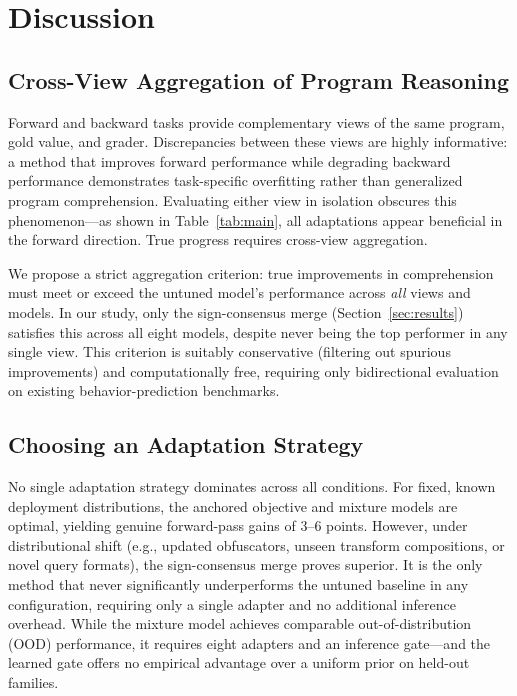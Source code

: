 \section{Discussion}
\label{sec:discussion}

\subsection{Cross-View Aggregation of Program Reasoning}
Forward and backward tasks provide complementary views of the same program, gold value, and grader. Discrepancies between these views are highly informative: a method that improves forward performance while degrading backward performance demonstrates task-specific overfitting rather than generalized program comprehension. Evaluating either view in isolation obscures this phenomenon—as shown in Table~\ref{tab:main}, all adaptations appear beneficial in the forward direction. True progress requires cross-view aggregation.

We propose a strict aggregation criterion: true improvements in comprehension must meet or exceed the untuned model's performance across \emph{all} views and models. In our study, only the sign-consensus merge (Section~\ref{sec:results}) satisfies this across all eight models, despite never being the top performer in any single view. This criterion is suitably conservative (filtering out spurious improvements) and computationally free, requiring only bidirectional evaluation on existing behavior-prediction benchmarks.

\subsection{Choosing an Adaptation Strategy}
No single adaptation strategy dominates across all conditions. For fixed, known deployment distributions, the anchored objective and mixture models are optimal, yielding genuine forward-pass gains of 3--6 points. However, under distributional shift (e.g., updated obfuscators, unseen transform compositions, or novel query formats), the sign-consensus merge proves superior. It is the only method that never significantly underperforms the untuned baseline in any configuration, requiring only a single adapter and no additional inference overhead. While the mixture model achieves comparable out-of-distribution (OOD) performance, it requires eight adapters and an inference gate---and the learned gate offers no empirical advantage over a uniform prior on held-out families.

